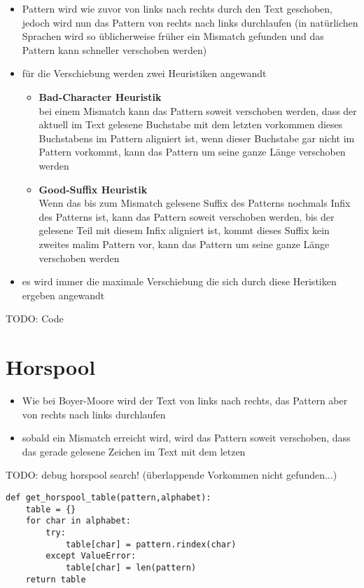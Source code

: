 \documentclass[11pt]{article}
\begin{document}
\begin{itemize}
	\item Pattern wird wie zuvor von links nach rechts durch den Text geschoben, jedoch wird nun das Pattern von rechts nach links durchlaufen (in natürlichen Sprachen wird so üblicherweise früher ein Mismatch gefunden und das Pattern kann schneller verschoben werden)
	\item für die Verschiebung werden zwei Heuristiken angewandt
	\begin{itemize}
        \item \textbf{Bad-Character Heuristik}\\
        bei einem Mismatch kann das Pattern soweit verschoben werden, dass der aktuell im Text gelesene Buchstabe mit dem letzten vorkommen dieses Buchstabens im Pattern aligniert ist, wenn dieser Buchstabe gar nicht im Pattern vorkommt, kann das Pattern um seine ganze Länge verschoben werden
        \item \textbf{Good-Suffix Heuristik}\\
        Wenn das bis zum Mismatch gelesene Suffix des Patterns nochmals Infix des Patterns ist, kann das Pattern soweit verschoben werden, bis der gelesene Teil mit diesem Infix aligniert ist, kommt dieses Suffix kein zweites malim Pattern vor, kann das Pattern um seine ganze Länge verschoben werden 
    \end{itemize}
    \item es wird immer die maximale Verschiebung die sich durch diese Heristiken ergeben angewandt
\end{itemize}

TODO: Code


\section{Horspool}

\begin{itemize}
	\item Wie bei Boyer-Moore wird der Text von links nach rechts, das Pattern aber von rechts nach links durchlaufen
	\item sobald ein Mismatch erreicht wird, wird das Pattern soweit verschoben, dass das gerade gelesene Zeichen im Text mit dem letzen
\end{itemize}

TODO: debug horspool search! (überlappende Vorkommen nicht gefunden...)

\begin{lstlisting}
def get_horspool_table(pattern,alphabet):
    table = {}
    for char in alphabet:
        try:
            table[char] = pattern.rindex(char)
        except ValueError:
            table[char] = len(pattern)
    return table
\end{lstlisting}
\end{document}
